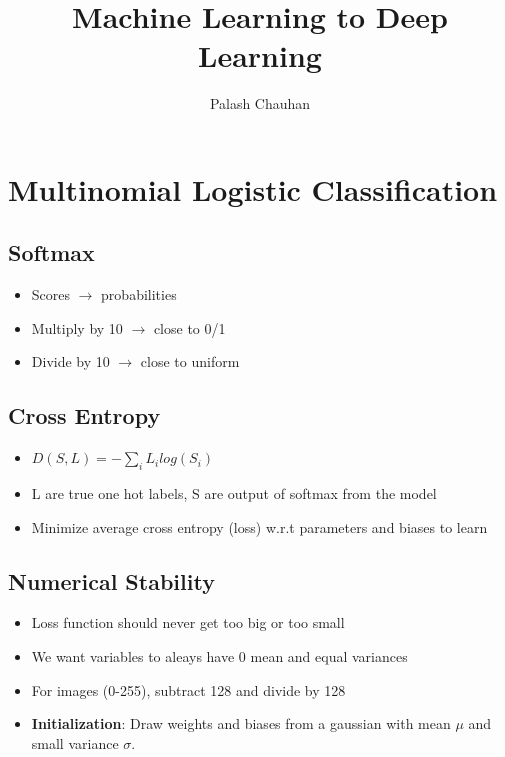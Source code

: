 \documentclass{article}
\begin{document}
\title{Machine Learning to Deep Learning}
\author{Palash Chauhan}

\maketitle

\section{Multinomial Logistic Classification}

\subsection{Softmax}
\begin{itemize}
	\item Scores $\rightarrow$ probabilities
	\item Multiply by 10 $\rightarrow$ close to 0/1
	\item Divide by 10 $\rightarrow$ close to uniform 
\end{itemize}

\subsection{Cross Entropy}
\begin{itemize}
	\item $D(S, L) = -\sum_{i} L_i log(S_i)$
	\item L are true one hot labels, S are output of softmax from the model
	\item Minimize average cross entropy (loss) w.r.t parameters and biases to learn
\end{itemize}

\subsection{Numerical Stability}
\begin{itemize}
	\item Loss function should never get too big or too small
	\item We want variables to aleays have 0 mean and equal variances
	\item For images (0-255), subtract 128 and divide by 128
	\item \textbf{Initialization}: Draw weights and biases from a gaussian with mean $\mu$ and small variance $\sigma$. 
\end{itemize}
\end{document}
